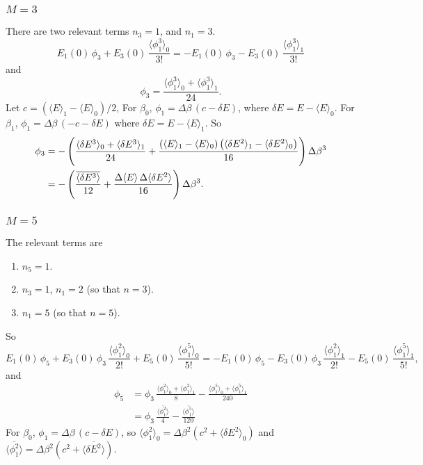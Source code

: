 \documentclass[aip,jcp,preprint,notitlepage, superscriptaddress]{revtex4-1}
\begin{document}
\subsubsection{$M = 3$}



There are two relevant terms
$n_3 = 1$,
and $n_1 = 3$.
%
\[
E_1(0) \, \phi_3
+
E_3(0) \, \frac{ \langle \phi_1^3 \rangle_0 } { 3! }
=
-E_1(0) \, \phi_3
-
E_3(0) \, \frac{ \langle \phi_1^3 \rangle_1 }{ 3! }
\]
and
\[
\phi_3
=
\frac{
\langle \phi_1^3 \rangle_0
+
\langle \phi_1^3 \rangle_1
}{24}.
\]
%
Let
$c = \left( \langle E \rangle_1 - \langle E \rangle_0 \right) / 2$,
For $\beta_0$,
$\phi_1 = \Delta \beta \, (c - \delta E)$,
where
$\delta E = E - \langle E \rangle_0$.
%
For $\beta_1$,
$\phi_1 = \Delta \beta \, (-c -\delta E)$
where
$\delta E = E - \langle E \rangle_1$.
%
So
\begin{align*}
\phi_3
&=
-\left(
\frac{
\langle \delta E^3 \rangle_0
+
\langle \delta E^3 \rangle_1
}{24}
+
\frac{
  \left(
    \langle E \rangle_1
    -
    \langle E \rangle_0
  \right)
  \left(
    \langle \delta E^2 \rangle_1
    -
    \langle \delta E^2 \rangle_0
  \right)
}{16}
\right)
\Delta \beta^3
\notag \\
&=
-\left(
\frac{
  \overline{ \langle \delta E^3 \rangle }
}{12}
+
\frac{
  \Delta \langle E \rangle
  \,
  \Delta \langle \delta E^2 \rangle
}{16}
\right) \Delta \beta^3.
\end{align*}




\subsubsection{$M = 5$}



The relevant terms are
%
\begin{enumerate}
\item $n_5 = 1$.
\item $n_3 = 1$, $n_1 = 2$ (so that $n = 3$).
\item $n_1 = 5$ (so that $n = 5$).
\end{enumerate}
%
So
\begin{equation*}
E_1(0) \, \phi_5
+E_3(0) \, \phi_3 \, \frac{ \langle \phi_1^2 \rangle_0 } { 2! }
+E_5(0) \, \frac{ \langle \phi_1^5 \rangle_0 } { 5! }
=
-E_1(0) \, \phi_5
-E_3(0) \, \phi_3 \, \frac{ \langle \phi_1^2 \rangle_1 } { 2! }
-E_5(0) \, \frac{ \langle \phi_1^5 \rangle_1 } { 5! },
\end{equation*}
and
\begin{align*}
\phi_5
&=
\phi_3 \, \frac{ \langle \phi_1^2 \rangle_0 + \langle \phi_1^2 \rangle_1 } { 8 }
-\frac{ \langle \phi_1^5 \rangle_0 + \langle \phi_1^5 \rangle_1 } { 240 }
\\
&=
\phi_3 \, \frac{ \overline{ \langle \phi_1^2 \rangle } } { 4 }
-\frac{ \overline{ \langle \phi_1^5 \rangle } } { 120 }
\end{align*}
%
For $\beta_0$,
$\phi_1 = \Delta \beta \, (c -\delta E)$,
so
$\langle \phi_1^2 \rangle_0 = \Delta \beta^2 \left( c^2 + \langle \delta E^2 \rangle_0 \right)$
and
$\overline{ \langle \phi_1^2 \rangle } = \Delta \beta^2 \left( c^2 + \overline{ \langle \delta E^2 \rangle } \right)$.
\end{document}
